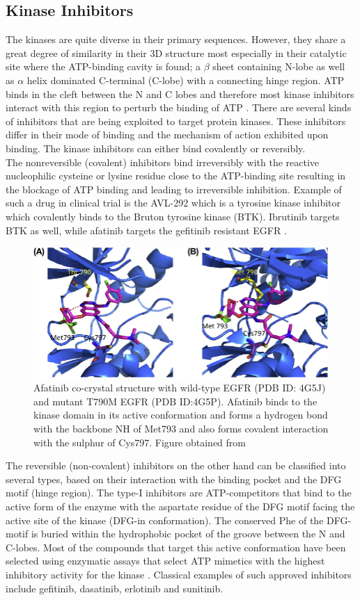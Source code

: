 \documentclass[a4paper, 11pt]{report}
\begin{document}
\subsection{Kinase Inhibitors}
The kinases are quite diverse in their primary sequences. However, they share a great degree of similarity in their 3D structure most especially in their catalytic site where the ATP-binding cavity is found; a $\beta$ sheet containing N-lobe as well as $\alpha$ helix dominated C-terminal (C-lobe) with a connecting hinge region. ATP binds in the cleft between the N and C lobes and therefore most kinase inhibitors interact with this region to perturb the binding of ATP \cite{wu2015fda}. There are several kinds of inhibitors that are being exploited to target protein kinases. These inhibitors differ in their mode of binding and the mechanism of action exhibited upon binding. The kinase inhibitors can either bind covalently or reversibly.\\
The nonreversible (covalent) inhibitors bind irreversibly with the reactive nucleophilic cysteine or lysine residue close to the ATP-binding site resulting in the blockage of ATP binding and leading to irreversible inhibition. Example of such a drug in clinical trial is the AVL-292 which is a tyrosine kinase inhibitor which covalently binds to the Bruton tyrosine kinase (BTK)\cite{robak2012tyrosine}. Ibrutinib targets BTK as well, while afatinib targets the gefitinib resistant EGFR \cite{akinleye2014ibrutinib}.\\
\begin{figure}[H]
	\includegraphics[width=.8\linewidth]{figures/Afatinib.jpg}
	\centering
	\caption{Afatinib co-crystal structure with wild-type EGFR (PDB ID: 4G5J) and mutant T790M EGFR (PDB ID:4G5P). Afatinib binds to the kinase domain in its active conformation and forms a hydrogen bond with the backbone NH of Met793 and also forms covalent interaction with the sulphur of Cys797. Figure obtained from \cite{hossam2016covalent}}
	\label{afatinib}
\end{figure}
The reversible (non-covalent) inhibitors on the other hand can be classified into several types, based on their interaction with the binding pocket and the DFG motif (hinge region). The type-I inhibitors are ATP-competitors that bind to the active form of the enzyme with the aspartate residue of the DFG motif facing the active site of the kinase (DFG-in conformation). The conserved Phe of the DFG-motif is buried within the hydrophobic pocket of the groove between the N and C-lobes. Most of the compounds that target this active conformation have been selected using enzymatic assays that select ATP mimetics with the highest inhibitory activity for the kinase \cite{fabbro2015ten}. Classical examples of such approved inhibitors include gefitinib, dasatinib, erlotinib and sunitinib.\\ 
\end{document}
